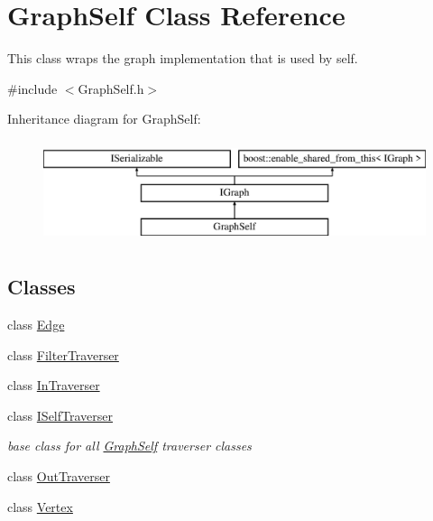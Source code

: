 \hypertarget{class_graph_self}{}\section{Graph\+Self Class Reference}
\label{class_graph_self}


This class wraps the graph implementation that is used by self.  




{\ttfamily \#include $<$Graph\+Self.\+h$>$}

Inheritance diagram for Graph\+Self\+:\begin{figure}[H]
\begin{center}
\leavevmode
\includegraphics[height=3.000000cm]{class_graph_self}
\end{center}
\end{figure}
\subsection*{Classes}
\begin{DoxyCompactItemize}
\item 
class \hyperlink{class_graph_self_1_1_edge}{Edge}
\item 
class \hyperlink{class_graph_self_1_1_filter_traverser}{Filter\+Traverser}
\item 
class \hyperlink{class_graph_self_1_1_in_traverser}{In\+Traverser}
\item 
class \hyperlink{class_graph_self_1_1_i_self_traverser}{I\+Self\+Traverser}
\begin{DoxyCompactList}\small\item\em base class for all \hyperlink{class_graph_self}{Graph\+Self} traverser classes \end{DoxyCompactList}\item 
class \hyperlink{class_graph_self_1_1_out_traverser}{Out\+Traverser}
\item 
class \hyperlink{class_graph_self_1_1_vertex}{Vertex}
\end{DoxyCompactItemize}
